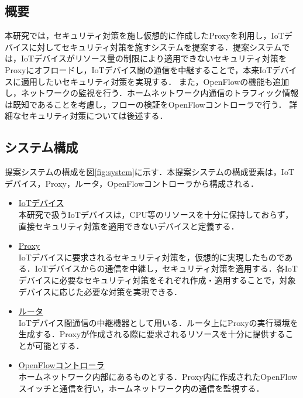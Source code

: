 \documentclass[Japanese]{dicomopapers}
\begin{document}
\subsection{概要}
本研究では，セキュリティ対策を施し仮想的に作成したProxyを利用し，IoTデバイスに対してセキュリティ対策を施すシステムを提案する．提案システムでは，IoTデバイスがリソース量の制限により適用できないセキュリティ対策をProxyにオフロードし，IoTデバイス間の通信を中継することで，本来IoTデバイスに適用したいセキュリティ対策を実現する．
また，OpenFlowの機能も追加し，ネットワークの監視を行う．ホームネットワーク内通信のトラフィック情報は既知であることを考慮し，フローの検証をOpenFlowコントローラで行う．
詳細なセキュリティ対策については後述する．


\subsection{システム構成}
提案システムの構成を図\ref{fig:system}に示す．本提案システムの構成要素は，IoTデバイス，Proxy，ルータ，OpenFlowコントローラから構成される．
\begin{itemize}
	\item \underline{IoTデバイス}\mbox{}\\
	      本研究で扱うIoTデバイスは，CPU等のリソースを十分に保持しておらず，直接セキュリティ対策を適用できないデバイスと定義する．
	\item \underline{Proxy}\mbox{}\\
	      IoTデバイスに要求されるセキュリティ対策を，仮想的に実現したものである．IoTデバイスからの通信を中継し，セキュリティ対策を適用する．各IoTデバイスに必要なセキュリティ対策をそれぞれ作成・適用することで，対象デバイスに応じた必要な対策を実現できる．
	\item \underline{ルータ}\mbox{}\\
	      IoTデバイス間通信の中継機器として用いる．ルータ上にProxyの実行環境を生成する．Proxyが作成される際に要求されるリソースを十分に提供することが可能とする．
	\item \underline{OpenFlowコントローラ}\mbox{}\\
	      ホームネットワーク内部にあるものとする．Proxy内に作成されたOpenFlowスイッチと通信を行い，ホームネットワーク内の通信を監視する．
\end{itemize}
\end{document}
